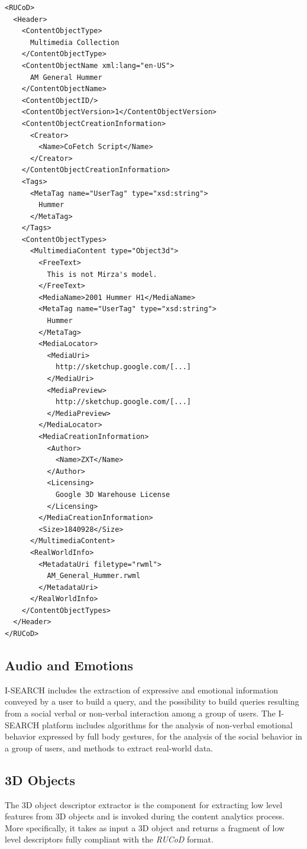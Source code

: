 \documentclass{acm_proc_article-sp}
\let\oldemph\emph
\renewcommand{\emph}[1]{\oldemph{\fontsize{9}{9}\selectfont #1}}
\begin{document}
\begin{lstlisting}[caption=Sample \emph{RUCoD} snippet (namespace declarations and some details removed for legibility reasons).,label={lst:rucod}]
<RUCoD>
  <Header>
    <ContentObjectType>
      Multimedia Collection
    </ContentObjectType>
    <ContentObjectName xml:lang="en-US">
      AM General Hummer
    </ContentObjectName>
    <ContentObjectID/>
    <ContentObjectVersion>1</ContentObjectVersion>
    <ContentObjectCreationInformation>
      <Creator>
        <Name>CoFetch Script</Name>
      </Creator>
    </ContentObjectCreationInformation>
    <Tags>
      <MetaTag name="UserTag" type="xsd:string">
        Hummer
      </MetaTag>
    </Tags>
    <ContentObjectTypes>
      <MultimediaContent type="Object3d">
        <FreeText>
          This is not Mirza's model.
        </FreeText>
        <MediaName>2001 Hummer H1</MediaName>
        <MetaTag name="UserTag" type="xsd:string">
          Hummer
        </MetaTag>
        <MediaLocator>
          <MediaUri>
            http://sketchup.google.com/[...]
          </MediaUri>
          <MediaPreview>
            http://sketchup.google.com/[...]
          </MediaPreview>
        </MediaLocator>
        <MediaCreationInformation>
          <Author>
            <Name>ZXT</Name>
          </Author>
          <Licensing>
            Google 3D Warehouse License
          </Licensing>
        </MediaCreationInformation>
        <Size>1840928</Size>
      </MultimediaContent>
      <RealWorldInfo>
        <MetadataUri filetype="rwml">
          AM_General_Hummer.rwml
        </MetadataUri>
      </RealWorldInfo>
    </ContentObjectTypes>
  </Header>
</RUCoD>
\end{lstlisting}

\subsection{Audio and Emotions}
\mbox{I-SEARCH} includes the extraction of expressive and emotional information conveyed by a user to build a query, and the possibility to build queries resulting from a social verbal or non-verbal interaction among a group of users.
The I-SEARCH platform includes algorithms for the analysis of non-verbal emotional behavior expressed by full body gestures, for the analysis of the social behavior in a group of users, and  methods to extract real-world data.

\subsection{3D Objects}
The 3D object descriptor extractor is the component for extracting low level features from 3D objects and is invoked during the content analytics process.
More specifically, it takes as input a 3D object and returns a fragment of low level descriptors fully compliant with the \emph{RUCoD} format.
\end{document}
